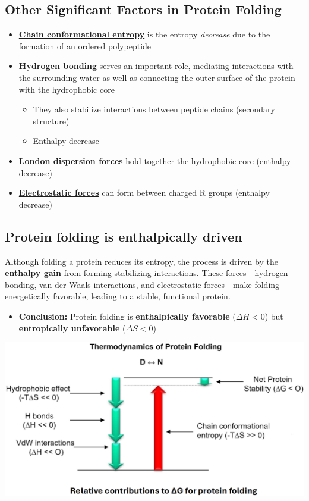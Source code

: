 \documentclass[10pt]{article}
\begin{document}
\subsection*{Other Significant Factors in Protein Folding}
\begin{itemize}
    \item \textbf{\underline{Chain conformational entropy}} is the entropy \textit{decrease} due to the formation of an ordered polypeptide
    \item \textbf{\underline{Hydrogen bonding}} serves an important role, mediating interactions with the surrounding water as well as connecting the outer surface of the protein with the hydrophobic core
    \begin{itemize}
        \item They also stabilize interactions between peptide chains (secondary structure)
        \item Enthalpy decrease
    \end{itemize}
    \item \textbf{\underline{London dispersion forces}} hold together the hydrophobic core (enthalpy decrease)
    \item \textbf{\underline{Electrostatic forces}} can form between charged R groups (enthalpy decrease)
\end{itemize}

\subsection*{Protein folding is enthalpically driven}
Although folding a protein reduces its entropy, the process is driven by the \textbf{enthalpy gain} from forming stabilizing interactions.  These forces - hydrogen bonding, van der Waals interactions, and electrostatic forces - make folding energetically favorable, leading to a stable, functional protein.
\begin{itemize}
    \item \textbf{Conclusion:} Protein folding is \textbf{enthalpically favorable} ($\Delta H < 0$) but \textbf{entropically unfavorable} ($\Delta S < 0$)
\end{itemize}
\begin{center}
    \includegraphics*[width=\textwidth]{L1_7.png}
\end{center}
\end{document}
